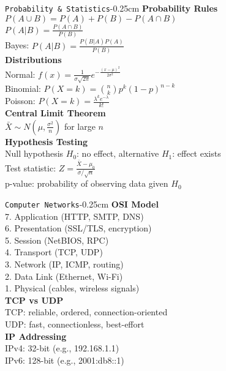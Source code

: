 \documentclass[10pt,3col]{cheatsheet}
\begin{document}
\begin{multicols}{3}
\begin{cheatsheetbox}{\texttt{Probability \& Statistics}}{-0.25cm}
    \textbf{Probability Rules}\\
    $P(A \cup B) = P(A) + P(B) - P(A \cap B)$\\
    $P(A|B) = \frac{P(A \cap B)}{P(B)}$\\
    Bayes: $P(A|B) = \frac{P(B|A)P(A)}{P(B)}$\\
    \textbf{Distributions}\\
    Normal: $f(x) = \frac{1}{\sigma\sqrt{2\pi}}e^{-\frac{(x-\mu)^2}{2\sigma^2}}$\\
    Binomial: $P(X=k) = \binom{n}{k}p^k(1-p)^{n-k}$\\
    Poisson: $P(X=k) = \frac{\lambda^k e^{-\lambda}}{k!}$\\
    \textbf{Central Limit Theorem}\\
    $\bar{X} \sim N\left(\mu, \frac{\sigma^2}{n}\right)$ for large $n$\\
    \textbf{Hypothesis Testing}\\
    Null hypothesis $H_0$: no effect, alternative $H_1$: effect exists\\
    Test statistic: $Z = \frac{\bar{X} - \mu_0}{\sigma/\sqrt{n}}$\\
    p-value: probability of observing data given $H_0$
\end{cheatsheetbox}

\begin{cheatsheetbox}{\texttt{Computer Networks}}{-0.25cm}
    \textbf{OSI Model}\\
    7. Application (HTTP, SMTP, DNS)\\
    6. Presentation (SSL/TLS, encryption)\\
    5. Session (NetBIOS, RPC)\\
    4. Transport (TCP, UDP)\\
    3. Network (IP, ICMP, routing)\\
    2. Data Link (Ethernet, Wi-Fi)\\
    1. Physical (cables, wireless signals)\\
    \textbf{TCP vs UDP}\\
    TCP: reliable, ordered, connection-oriented\\
    UDP: fast, connectionless, best-effort\\
    \textbf{IP Addressing}\\
    IPv4: 32-bit (e.g., 192.168.1.1)\\
    IPv6: 128-bit (e.g., 2001:db8::1)
\end{cheatsheetbox}


\end{multicols}
\end{document}
